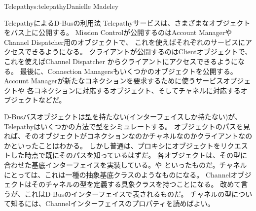 \begin{aosachapter}{Telepathy}{s:telepathy}{Danielle Madeley}
\begin{aosasect1}{TelepathyによるD-Busの利用法}
Telepathyサービスは、さまざまなオブジェクトをバス上に公開する。
Mission Controlが公開するのはAccount ManagerやChannel Dispatcher用のオブジェクトで、
これを使えばそれぞれのサービスにアクセスできるようになる。
クライアントが公開するのはClientオブジェクトで、これを使えばChannel Dispatcher
からクライアントにアクセスできるようになる。
最後に、Connection Managersもいくつかのオブジェクトを公開する。
Account Managerが新たなコネクションを要求するために使うサービスオブジェクトや
各コネクションに対応するオブジェクト、そしてチャネルに対応するオブジェクトなどだ。

D-Busバスオブジェクトは型を持たない(インターフェイスしか持たない)が、
Telepathyはいくつかの方法で型をシミュレートする。
オブジェクトのパスを見れば、そのオブジェクトがコネクションなのかチャネルなのかクライアントなのかといったことはわかる。
しかし普通は、プロキシにオブジェクトをリクエストした時点で既にそのパスを知っているはずだ。
各オブジェクトは、その型に合わせた基底インターフェイスを実装している。や
といったものだ。チャネルにとっては、これは一種の抽象基底クラスのようなものになる。
Channelオブジェクトはそのチャネルの型を定義する具象クラスを持つことになる。
改めて言うが、これはD-Busのインターフェイスで表されるものだ。
チャネルの型について知るには、Channelインターフェイスのプロパティを読めばよい。


\end{aosasect1}
\end{aosachapter}
